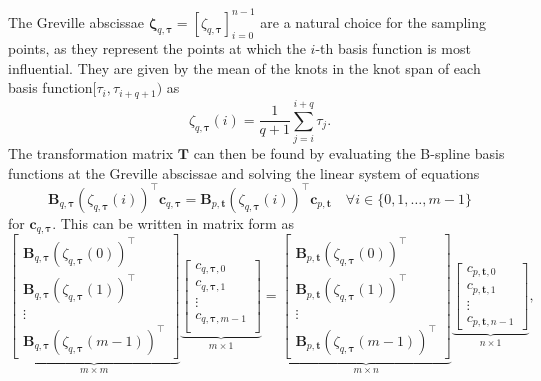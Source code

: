 The Greville abscissae $\boldsymbol \zeta_{q,\boldsymbol \tau}=[\zeta_{q,\boldsymbol \tau}]_{i=0}^{n-1}$ are a natural choice for the sampling points, as they represent the points at which the $i$-th basis function is most influential. 
They are given by the mean of the knots in the knot span  of each basis function$[\tau_i, \tau_{i+q+1})$ as
\begin{equation}
    \zeta_{q,\boldsymbol \tau}(i) = \frac{1}{q+1} \sum_{j=i}^{i+q} \tau_j.
\end{equation}
The transformation matrix $\mathbf T$ can then be found by evaluating the B-spline basis functions at the Greville abscissae and solving the linear system of equations
\begin{equation}
    \mathbf B_{q,\boldsymbol \tau}(\zeta_{q,\boldsymbol \tau}(i))^\top \mathbf c_{q, \boldsymbol \tau} = \mathbf B_{p,\mathbf t}(\zeta_{q,\boldsymbol \tau}(i))^\top \mathbf c_{p, \mathbf t} \quad \forall i\in\{0,1,\ldots,m-1\}
\end{equation}
for $\mathbf c_{q, \boldsymbol \tau}$. This can be written in matrix form as
\begin{equation}
    \underbrace{\begin{bmatrix}
        \mathbf B_{q,\boldsymbol \tau}(\zeta_{q,\boldsymbol \tau}(0))^\top \\
        \mathbf B_{q,\boldsymbol \tau}(\zeta_{q,\boldsymbol \tau}(1))^\top \\
        \vdots                                                             \\
        \mathbf B_{q,\boldsymbol \tau}(\zeta_{q,\boldsymbol \tau}(m-1))^\top
    \end{bmatrix}}_{m \times m}
    \underbrace{\begin{bmatrix}
        c_{q, \boldsymbol \tau, 0}   \\
        c_{q, \boldsymbol \tau, 1}   \\
        \vdots                       \\
        c_{q, \boldsymbol \tau, m-1} \\
    \end{bmatrix}}_{m \times 1}
    = 
    \underbrace{\begin{bmatrix}
        \mathbf B_{p,\mathbf t}(\zeta_{q,\boldsymbol \tau}(0))^\top  \\
        \mathbf B_{p,\mathbf t}(\zeta_{q,\boldsymbol \tau}(1))^\top  \\
        \vdots                                                       \\
        \mathbf B_{p,\mathbf t}(\zeta_{q,\boldsymbol \tau}(m-1))^\top
    \end{bmatrix}}_{m \times n}
    \underbrace{\begin{bmatrix}
        c_{p, \mathbf t, 0}   \\
        c_{p, \mathbf t, 1}   \\
        \vdots                \\
        c_{p, \mathbf t, n-1}
    \end{bmatrix}}_{n \times 1},
\end{equation}

